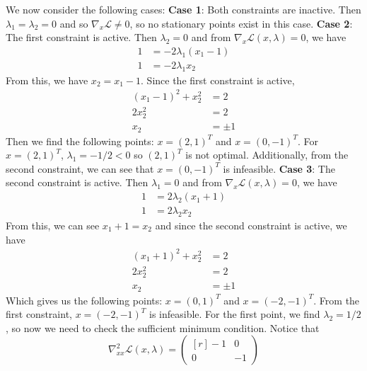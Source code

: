 \documentclass{article}
\begin{document}
We now consider the following cases:
\newline\newline
\textbf{Case 1}: Both constraints are inactive.
\newline
Then $\lambda_1 = \lambda_2 = 0$ and so $\nabla_x \mathscr{L} \neq 0$, so no stationary points exist in this case.
\newline\newline
\textbf{Case 2}: The first constraint is active.
\newline
Then $\lambda_2 = 0$ and from $\nabla_x\mathscr{L}(x,\lambda) = 0$, we have
\begin{align*}
    1 &= -2\lambda_1(x_1 - 1)\\
    1 &= -2\lambda_1x_2
\end{align*}
From this, we have $x_2 = x_1 - 1$. Since the first constraint is active, 
\begin{align*}
    (x_1 - 1)^2 + x_2^2 &= 2\\
    2x_2^2 &= 2\\
    x_2 &= \pm 1
\end{align*}
Then we find the following points: $x = (2, 1)^T$ and $x = (0,-1)^T$. For $x = (2, 1)^T$, $\lambda_1 = -1/2 < 0$ so $(2,1)^T$ is not optimal. Additionally, from the second constraint, we can see that $x = (0, -1)^T$ is infeasible.
\newline\newline
\textbf{Case 3}: The second constraint is active.
\newline
Then $\lambda_1 = 0$ and from $\nabla_x \mathscr{L}(x, \lambda) = 0$, we have
\begin{align*}
    1 &= 2\lambda_2(x_1 + 1)\\
    1 &= 2\lambda_2x_2
\end{align*}
From this, we can see $x_1 + 1 = x_2$ and since the second constraint is active, we have
\begin{align*}
    (x_1 + 1)^2 + x_2^2 &= 2\\
    2x_2^2 &= 2\\
    x_2 &= \pm 1
\end{align*}
Which gives us the following points: $x = (0, 1)^T$ and $x = (-2, -1)^T$. From the first constraint, $x = (-2,-1)^T$ is infeasible. For the first point, we find $\lambda_2 = 1/2$, so now we need to check the sufficient minimum condition. Notice that 
\[\nabla_{xx}^2\mathscr{L}(x,\lambda) = \begin{pmatrix*}[r]
    -1 & 0\\
    0 & -1
\end{pmatrix*}\]
\end{document}
